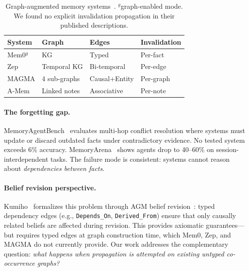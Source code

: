 \documentclass{article}
\begin{document}
\begin{table}[htbp]
\centering
\footnotesize
\begin{tabular}{llll}
\toprule
\textbf{System} & \textbf{Graph} & \textbf{Edges} & \textbf{Invalidation} \\
\midrule
Mem0$^g$ & KG & Typed & Per-fact \\
Zep & Temporal KG & Bi-temporal & Per-edge \\
MAGMA & 4 sub-graphs & Causal+Entity & Per-graph \\
A-Mem & Linked notes & Associative & Per-note \\
\bottomrule
\end{tabular}
\caption{Graph-augmented memory systems~\citep{mem0_2024, zep_2025, magma_2026, amem_2025}. $^g$graph-enabled mode. We found no explicit invalidation propagation in their published descriptions.}
\label{tab:systems}
\end{table}

\paragraph{The forgetting gap.}
MemoryAgentBench~\citep{memoryagentbench_2026} evaluates multi-hop conflict resolution where systems must update or discard outdated facts under contradictory evidence.
No tested system exceeds 6\% accuracy.
MemoryArena~\citep{memoryarena_2026} shows agents drop to 40--60\% on session-interdependent tasks.
The failure mode is consistent: systems cannot reason about \textit{dependencies between facts}.

\paragraph{Belief revision perspective.}
Kumiho~\citep{kumiho_2026} formalizes this problem through AGM belief revision~\citep{agm_1985}: typed dependency edges (e.g., \texttt{Depends\_On}, \texttt{Derived\_From}) ensure that only causally related beliefs are affected during revision.
This provides axiomatic guarantees---but requires typed edges at graph construction time, which Mem0, Zep, and MAGMA do not currently provide.
Our work addresses the complementary question: \textit{what happens when propagation is attempted on existing untyped co-occurrence graphs?}
\end{document}
